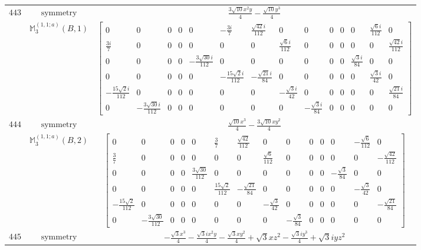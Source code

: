 \documentclass[fleqn,8pt,landscape]{jsarticle}
\begin{document}
\begin{longtable}{ccc}
$ 443 $ & $ \text{symmetry} $ & $ \frac{3 \sqrt{10} x^{2} y}{4} - \frac{\sqrt{10} y^{3}}{4} $ \\
$  $ & $ \mathbb{M}_{3}^{(1,1;a)}(B,1) $ & $ \begin{bmatrix} 0 & 0 & 0 & 0 & 0 & - \frac{3 i}{7} & \frac{\sqrt{42} i}{112} & 0 & 0 & 0 & 0 & 0 & \frac{\sqrt{6} i}{112} & 0 \\ \frac{3 i}{7} & 0 & 0 & 0 & 0 & 0 & 0 & \frac{\sqrt{6} i}{112} & 0 & 0 & 0 & 0 & 0 & \frac{\sqrt{42} i}{112} \\ 0 & 0 & 0 & 0 & - \frac{3 \sqrt{30} i}{112} & 0 & 0 & 0 & 0 & 0 & 0 & \frac{\sqrt{3} i}{84} & 0 & 0 \\ 0 & 0 & 0 & 0 & 0 & - \frac{15 \sqrt{2} i}{112} & - \frac{\sqrt{21} i}{84} & 0 & 0 & 0 & 0 & 0 & \frac{\sqrt{3} i}{42} & 0 \\ - \frac{15 \sqrt{2} i}{112} & 0 & 0 & 0 & 0 & 0 & 0 & - \frac{\sqrt{3} i}{42} & 0 & 0 & 0 & 0 & 0 & \frac{\sqrt{21} i}{84} \\ 0 & - \frac{3 \sqrt{30} i}{112} & 0 & 0 & 0 & 0 & 0 & 0 & - \frac{\sqrt{3} i}{84} & 0 & 0 & 0 & 0 & 0 \end{bmatrix} $ \\ \hline
$ 444 $ & $ \text{symmetry} $ & $ \frac{\sqrt{10} x^{3}}{4} - \frac{3 \sqrt{10} x y^{2}}{4} $ \\
$  $ & $ \mathbb{M}_{3}^{(1,1;a)}(B,2) $ & $ \begin{bmatrix} 0 & 0 & 0 & 0 & 0 & \frac{3}{7} & \frac{\sqrt{42}}{112} & 0 & 0 & 0 & 0 & 0 & - \frac{\sqrt{6}}{112} & 0 \\ \frac{3}{7} & 0 & 0 & 0 & 0 & 0 & 0 & \frac{\sqrt{6}}{112} & 0 & 0 & 0 & 0 & 0 & - \frac{\sqrt{42}}{112} \\ 0 & 0 & 0 & 0 & \frac{3 \sqrt{30}}{112} & 0 & 0 & 0 & 0 & 0 & 0 & - \frac{\sqrt{3}}{84} & 0 & 0 \\ 0 & 0 & 0 & 0 & 0 & \frac{15 \sqrt{2}}{112} & - \frac{\sqrt{21}}{84} & 0 & 0 & 0 & 0 & 0 & - \frac{\sqrt{3}}{42} & 0 \\ - \frac{15 \sqrt{2}}{112} & 0 & 0 & 0 & 0 & 0 & 0 & - \frac{\sqrt{3}}{42} & 0 & 0 & 0 & 0 & 0 & - \frac{\sqrt{21}}{84} \\ 0 & - \frac{3 \sqrt{30}}{112} & 0 & 0 & 0 & 0 & 0 & 0 & - \frac{\sqrt{3}}{84} & 0 & 0 & 0 & 0 & 0 \end{bmatrix} $ \\ \hline
$ 445 $ & $ \text{symmetry} $ & $ - \frac{\sqrt{3} x^{3}}{4} - \frac{\sqrt{3} i x^{2} y}{4} - \frac{\sqrt{3} x y^{2}}{4} + \sqrt{3} x z^{2} - \frac{\sqrt{3} i y^{3}}{4} + \sqrt{3} i y z^{2} $ \\

\end{longtable}
\end{document}
